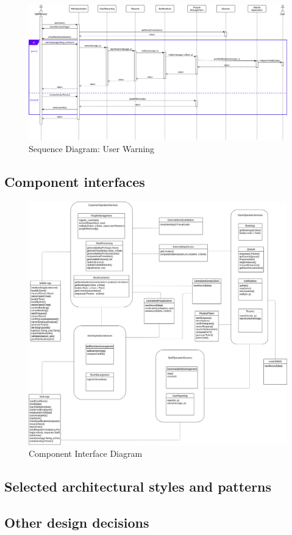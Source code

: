 \begin{landscape}
\begin{figure}[H]
	\includegraphics[width=\linewidth]{../Diagrams/Sequence/sequence_user_warn.png}
	\caption{Sequence Diagram: User Warning}
	\label{fig:sUserWarn}
\end{figure}

\end{landscape}
\subsection{Component interfaces}
\begin{figure}[H]
	\includegraphics[width=\linewidth]{../Diagrams/Component Interface.png}
	\caption{Component Interface Diagram}
	\label{fig:CompInt}
\end{figure}
\subsection{Selected architectural styles and patterns}
\subsection{Other design decisions}
